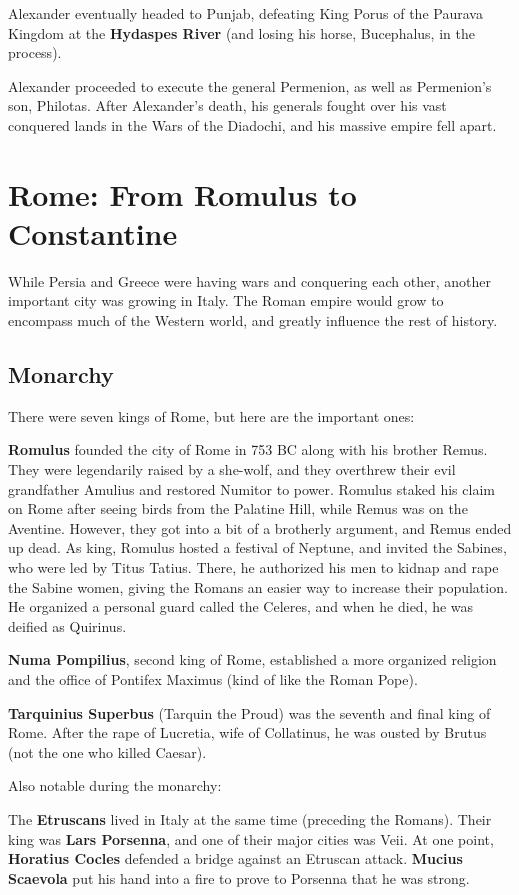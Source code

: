 Alexander eventually headed to Punjab,
defeating King Porus of the Paurava Kingdom at the \textbf{Hydaspes River}
(and losing his horse, Bucephalus, in the process).

Alexander proceeded to execute the general Permenion, as well as Permenion's son, Philotas.
After Alexander's death, his generals fought over his vast conquered lands in the Wars of the Diadochi,
and his massive empire fell apart.

\section{Rome: From Romulus to Constantine}

While Persia and Greece were having wars and conquering each other, another important city was growing in Italy.
The Roman empire would grow to encompass much of the Western world,
and greatly influence the rest of history.

\subsection*{Monarchy}

There were seven kings of Rome, but here are the important ones:

\textbf{Romulus} founded the city of Rome in 753 BC along with his brother Remus.
They were legendarily raised by a she-wolf,
and they overthrew their evil grandfather Amulius and restored Numitor to power.
Romulus staked his claim on Rome after seeing birds from the Palatine Hill, while Remus was on the Aventine.
However, they got into a bit of a brotherly argument, and Remus ended up dead.
As king, Romulus hosted a festival of Neptune, and invited the Sabines, who were led by Titus Tatius.
There, he authorized his men to kidnap and rape the Sabine women,
giving the Romans an easier way to increase their population.
He organized a personal guard called the Celeres, and when he died, he was deified as Quirinus.

\textbf{Numa Pompilius}, second king of Rome,
established a more organized religion and the office of Pontifex Maximus (kind of like the Roman Pope).

\textbf{Tarquinius Superbus} (Tarquin the Proud) was the seventh and final king of Rome.
After the rape of Lucretia, wife of Collatinus, he was ousted by Brutus (not the one who killed Caesar).

Also notable during the monarchy:

The \textbf{Etruscans} lived in Italy at the same time (preceding the Romans).
Their king was \textbf{Lars Porsenna}, and one of their major cities was Veii.
At one point, \textbf{Horatius Cocles} defended a bridge against an Etruscan attack.
\textbf{Mucius Scaevola} put his hand into a fire to prove to Porsenna that he was strong.

